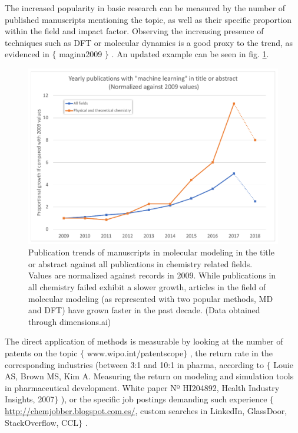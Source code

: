 The increased popularity in basic research can be measured by the number of published manuscripts mentioning the topic, as well as their specific proportion within the field and impact factor. Observing the increasing presence of techniques such as DFT or molecular dynamics is a good proxy to the trend, as evidenced in $ \{ $ maginn2009 $ \} $ . An updated example can be seen in fig. \ref{fig:pubtrends}.


\begin{figure}[H]
	\includegraphics[width=\textwidth]{./figures/01/publication-trends_crop.pdf}
	\caption[Publication trends in molecular modeling]{Publication trends of manuscripts in molecular modeling in the title or abstract against all publications in chemistry related fields. Values are normalized against records in 2009. While publications in all chemistry failed exhibit a slower growth, articles in the field of molecular modeling (as represented with two popular methods, MD and DFT) have grown faster in the past decade. (Data obtained through dimensions.ai)}
	\label{fig:pubtrends}
\end{figure}


The direct application of methods is measurable by looking at the number of patents on the topic $ \{ $ www.wipo.int/patentscope$ \} $ , the return rate in the corresponding industries (between 3:1 and 10:1 in pharma, according to $ \{ $ Louie AS, Brown MS, Kim A. Measuring the return on modeling and simulation tools in pharmaceutical development. White paper Nº HI204892, Health Industry Insights, 2007$ \} $ ), or the specific job postings demanding such experience $ \{ $ \href{http://chemjobber.blogspot.com.es/}{http://chemjobber.blogspot.com.es/}, custom searches in LinkedIn, GlassDoor, StackOverflow, CCL$ \} $ .

